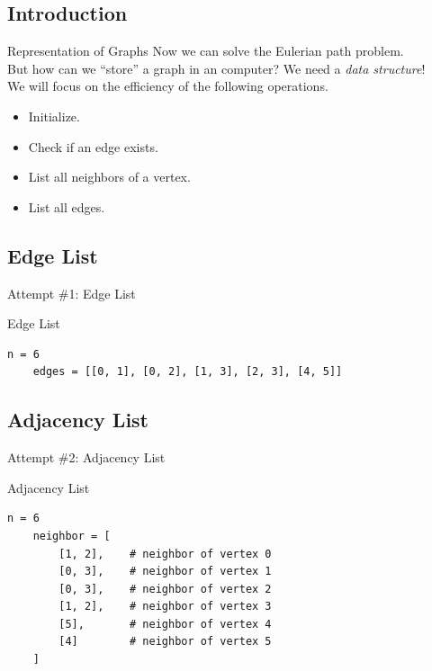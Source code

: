 \documentclass{beamer}
\begin{document}
\subsection{Introduction}
\begin{frame}{Representation of Graphs}
  Now we can solve the Eulerian path problem. \pause \\[.5em]
  But how can we ``store'' a graph in an computer? \pause
  We need a \emph{data structure}! \pause \\[1em]
  We will focus on the efficiency of the following operations. \pause
  \begin{itemize}
    \item Initialize. \pause
    \item Check if an edge exists. \pause
    \item List all neighbors of a vertex. \pause
    \item List all edges.
  \end{itemize}
\end{frame}

\subsection{Edge List}
\begin{frame}[fragile]{Attempt \#1: Edge List}
  \begin{block}{Edge List}
    \scriptsize
    \begin{lstlisting}[gobble=4]
    n = 6
    edges = [[0, 1], [0, 2], [1, 3], [2, 3], [4, 5]]
    \end{lstlisting}
  \end{block}
\end{frame}

\subsection{Adjacency List}
\begin{frame}[fragile]{Attempt \#2: Adjacency List}
  \begin{block}{Adjacency List}
    \scriptsize
    \begin{lstlisting}[gobble=4]
    n = 6
    neighbor = [
        [1, 2],    # neighbor of vertex 0
        [0, 3],    # neighbor of vertex 1
        [0, 3],    # neighbor of vertex 2
        [1, 2],    # neighbor of vertex 3
        [5],       # neighbor of vertex 4
        [4]        # neighbor of vertex 5
    ]
    \end{lstlisting}
  \end{block}
\end{frame}
\end{document}
